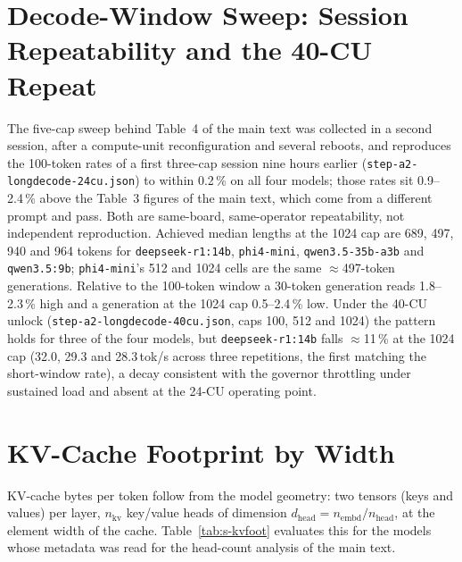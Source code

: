 \documentclass[11pt,a4paper]{article}
\begin{document}
\section{Decode-Window Sweep: Session Repeatability and the 40-CU Repeat}

The five-cap sweep behind Table~4 of the main text was collected in a
second session, after a compute-unit reconfiguration and several
reboots, and reproduces the 100-token rates of a first three-cap
session nine hours earlier (\texttt{step-a2-longdecode-24cu.json}) to
within 0.2\,\% on all four models; those rates sit 0.9--2.4\,\% above
the Table~3 figures of the main text, which come from a different
prompt and pass.  Both are same-board, same-operator repeatability,
not independent reproduction.  Achieved median lengths at the 1024 cap
are 689, 497, 940 and 964 tokens for \texttt{deepseek-r1:14b},
\texttt{phi4-mini}, \texttt{qwen3.5-35b-a3b} and \texttt{qwen3.5:9b};
\texttt{phi4-mini}'s 512 and 1024 cells are the same $\approx$497-token
generations.  Relative to the 100-token window a 30-token generation
reads 1.8--2.3\,\% high and a generation at the 1024 cap 0.5--2.4\,\%
low.  Under the 40-CU unlock (\texttt{step-a2-longdecode-40cu.json},
caps 100, 512 and 1024) the pattern holds for three of the four
models, but \texttt{deepseek-r1:14b} falls $\approx$11\,\% at the 1024
cap (32.0, 29.3 and 28.3\,tok/s across three repetitions, the first
matching the short-window rate), a decay consistent with the governor
throttling under sustained load and absent at the 24-CU operating
point.

\section{KV-Cache Footprint by Width}

KV-cache bytes per token follow from the model geometry: two tensors
(keys and values) per layer, $n_{\text{kv}}$ key/value heads of
dimension $d_{\text{head}} = n_{\text{embd}} / n_{\text{head}}$, at the
element width of the cache.  Table~\ref{tab:s-kvfoot} evaluates this for
the models whose metadata was read for the head-count analysis of the
main text.
\end{document}
